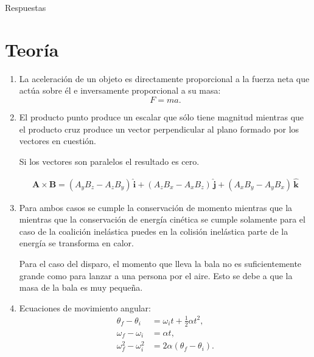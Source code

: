 \documentclass{article}
\begin{document}

\clearpage
\setcounter{section}{0}

\begin{center}
{\sc \huge Respuestas}
\end{center}

\section{Teoría} %
\label{sec:resteoria}


\begin{enumerate}
\item La aceleración de un objeto es directamente proporcional a la fuerza neta
que actúa sobre él e inversamente proporcional a su masa:
\begin{equation*}
F=ma.
\end{equation*}

\item El producto punto produce un escalar que sólo tiene magnitud mientras que
el producto cruz produce un vector perpendicular al plano formado por los
vectores en cuestión.

Si los vectores son paralelos el resultado es cero.

\begin{align*}
\mathbf{A} \times \mathbf{B} = 
(A_{y}B_{z} - A_{z}B_{y})\, \mathbf{\hat{i}} + 
(A_{z}B_{x} - A_{x}B_{z})\, \mathbf{\hat{j}} + 
(A_{x}B_{y} - A_{y}B_{x})\, \mathbf{\hat{k}}
\end{align*}

\item Para ambos casos se cumple la conservación de momento mientras que la
mientras que la conservación de energía cinética se cumple solamente para el
caso de la coalición inelástica puedes en la colisión inelástica parte de la
energía se transforma en calor.

Para el caso del disparo, el momento que lleva la bala no es suficientemente
grande como para lanzar a una persona por el aire. Esto se debe a que la masa
de la bala es muy pequeña.

\item Ecuaciones de movimiento angular:
\begin{align}
\theta_{f} - \theta_{i} &= \omega_{i}t + \frac{1}{2}\alpha t^{2}, \\
\omega_{f} - \omega_{i} &= \alpha t, \\
\omega_{f}^{2} - \omega_{i}^{2} &= 2\alpha (\theta_{f} - \theta_{i}).
\end{align}


\end{enumerate}
\end{document}
